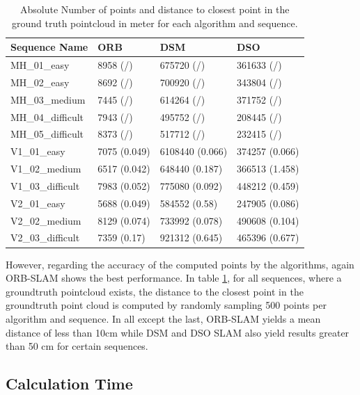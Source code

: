 	\begin{table}
	\caption{Absolute Number of points and distance to closest point in the ground truth pointcloud in meter for each algorithm and sequence.}
	\begin{tabular}{ |p{3cm}||p{3cm}|p{3cm}|p{3cm}|  }
	\hline
	Sequence Name& ORB & DSM & DSO \\
	\hline
	MH\_01\_easy & 8958 (/) & 675720 (/) & 361633 (/)\\
	MH\_02\_easy & 8692 (/) & 700920 (/) & 343804 (/)\\
	MH\_03\_medium & 7445 (/) & 614264 (/) & 371752 (/)\\
	MH\_04\_difficult & 7943 (/) & 495752 (/) & 208445 (/)\\
	MH\_05\_difficult & 8373 (/) & 517712 (/) & 232415 (/)\\
	V1\_01\_easy & 7075 (0.049) & 6108440 (0.066) & 374257 (0.066)\\
	V1\_02\_medium & 6517 (0.042) & 648440 (0.187) & 366513 (1.458)\\
	V1\_03\_difficult & 7983 (0.052) & 775080 (0.092) & 448212 (0.459)\\
	V2\_01\_easy & 5688 (0.049) & 584552 (0.58) & 247905 (0.086)\\
	V2\_02\_medium & 8129 (0.074)& 733992 (0.078) & 490608 (0.104)\\
	V2\_03\_difficult & 7359 (0.17) & 921312 (0.645) & 465396 (0.677)\\
	\hline
	\end{tabular}
	\label{table:pointcloud}
	\end{table}
	
	However, regarding the accuracy of the computed points by the algorithms, again ORB-SLAM shows the best performance. In table \ref{table:pointcloud}, 
	for all sequences, where a groundtruth pointcloud exists, the distance to the closest point in the groundtruth point cloud is computed by randomly sampling
	500 points per algorithm and sequence. In all except the last, ORB-SLAM yields a mean distance of less than 10cm while DSM and DSO SLAM also yield results 
	greater than 50 cm for certain sequences. 
	
	
	
	

\subsection{Calculation Time}

